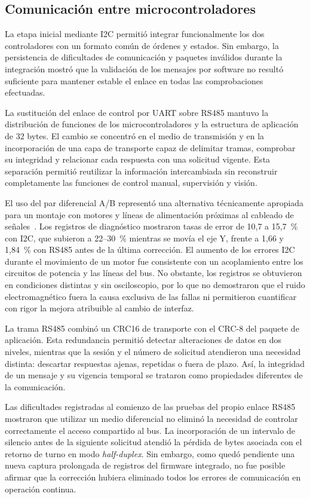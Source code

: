 \subsection{Comunicación entre microcontroladores}

La etapa inicial mediante I2C permitió integrar funcionalmente los dos controladores con un formato común de órdenes y estados. Sin embargo, la persistencia de dificultades de comunicación y paquetes inválidos durante la integración mostró que la validación de los mensajes por software no resultó suficiente para mantener estable el enlace en todas las comprobaciones efectuadas.

La sustitución del enlace de control por UART sobre RS485 mantuvo la distribución de funciones de los microcontroladores y la estructura de aplicación de 32 bytes. El cambio se concentró en el medio de transmisión y en la incorporación de una capa de transporte capaz de delimitar tramas, comprobar su integridad y relacionar cada respuesta con una solicitud vigente. Esta separación permitió reutilizar la información intercambiada sin reconstruir completamente las funciones de control manual, supervisión y visión.

El uso del par diferencial A/B representó una alternativa técnicamente apropiada para un montaje con motores y líneas de alimentación próximas al cableado de señales~\cite{kugelstadt2021rs485}. Los registros de diagnóstico mostraron tasas de error de 10,7 a 15,7~\% con I2C, que subieron a 22--30~\% mientras se movía el eje Y, frente a 1,66 y 1,84~\% con RS485 antes de la última corrección. El aumento de los errores I2C durante el movimiento de un motor fue consistente con un acoplamiento entre los circuitos de potencia y las líneas del bus. No obstante, los registros se obtuvieron en condiciones distintas y sin osciloscopio, por lo que no demostraron que el ruido electromagnético fuera la causa exclusiva de las fallas ni permitieron cuantificar con rigor la mejora atribuible al cambio de interfaz.

La trama RS485 combinó un CRC16 de transporte con el CRC-8 del paquete de aplicación. Esta redundancia permitió detectar alteraciones de datos en dos niveles, mientras que la sesión y el número de solicitud atendieron una necesidad distinta: descartar respuestas ajenas, repetidas o fuera de plazo. Así, la integridad de un mensaje y su vigencia temporal se trataron como propiedades diferentes de la comunicación.

Las dificultades registradas al comienzo de las pruebas del propio enlace RS485 mostraron que utilizar un medio diferencial no eliminó la necesidad de controlar correctamente el acceso compartido al bus. La incorporación de un intervalo de silencio antes de la siguiente solicitud atendió la pérdida de bytes asociada con el retorno de turno en modo \textit{half-duplex}. Sin embargo, como quedó pendiente una nueva captura prolongada de registros del firmware integrado, no fue posible afirmar que la corrección hubiera eliminado todos los errores de comunicación en operación continua.

